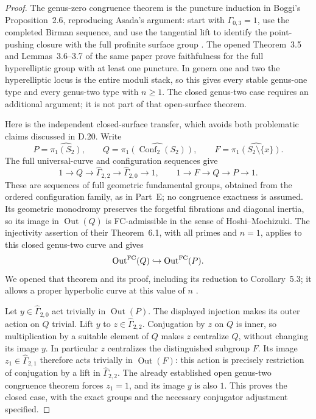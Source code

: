 \begin{proof}
The genus-zero congruence theorem is the puncture induction in Boggi's Proposition~2.6, reproducing Asada's argument: start with $\Gamma_{0,3}=1$, use the completed Birman sequence, and use the tangential lift to identify the point-pushing closure with the full profinite surface group \cite{D_Boggi2009}. The opened Theorem~3.5 and Lemmas~3.6--3.7 of the same paper prove faithfulness for the full hyperelliptic group with at least one puncture. In genera one and two the hyperelliptic locus is the entire moduli stack, so this gives every stable genus-one type and every genus-two type with $n\geq1$. The closed genus-two case requires an additional argument; it is not part of that open-surface theorem.

Here is the independent closed-surface transfer, which avoids both problematic claims discussed in D.20. Write
\[
 P=\widehat{\pi_1(S_2)},\qquad
 Q=\widehat{\pi_1(\operatorname{Conf}_2(S_2))},\qquad
 F=\widehat{\pi_1(S_2\setminus\{x\})}.
\]
The full universal-curve and configuration sequences give
\[
 1\longrightarrow Q\longrightarrow\widehat\Gamma_{2,2}
       \longrightarrow\widehat\Gamma_{2,0}\longrightarrow1,
 \qquad
 1\longrightarrow F\longrightarrow Q\longrightarrow P\longrightarrow1.
\]
These are sequences of full geometric fundamental groups, obtained from the ordered configuration family, as in Part~E; no congruence exactness is assumed. Its geometric monodromy preserves the forgetful fibrations and diagonal inertia, so its image in $\operatorname{Out}(Q)$ is FC-admissible in the sense of Hoshi--Mochizuki. The injectivity assertion of their Theorem~6.1, with all primes and $n=1$, applies to this closed genus-two curve and gives
\[
 \operatorname{Out}^{\rm FC}(Q)\hookrightarrow
 \operatorname{Out}^{\rm FC}(P).
\]
We opened that theorem and its proof, including its reduction to Corollary~5.3; it allows a proper hyperbolic curve at this value of $n$ \cite{D_HoshiMochizuki2011}.

Let $y\in\widehat\Gamma_{2,0}$ act trivially in $\operatorname{Out}(P)$. The displayed injection makes its outer action on $Q$ trivial. Lift $y$ to $z\in\widehat\Gamma_{2,2}$. Conjugation by $z$ on $Q$ is inner, so multiplication by a suitable element of $Q$ makes $z$ centralize $Q$, without changing its image $y$. In particular $z$ centralizes the distinguished subgroup $F$. Its image $z_1\in\widehat\Gamma_{2,1}$ therefore acts trivially in $\operatorname{Out}(F)$: this action is precisely restriction of conjugation by a lift in $\widehat\Gamma_{2,2}$. The already established open genus-two congruence theorem forces $z_1=1$, and its image $y$ is also $1$. This proves the closed case, with the exact groups and the necessary conjugator adjustment specified.


\end{proof}

